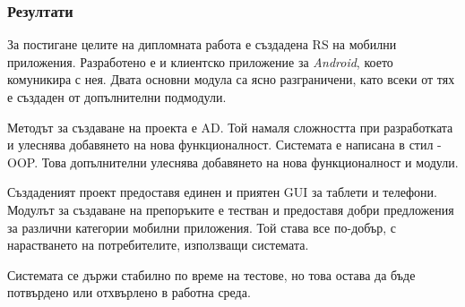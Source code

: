 \subsubsection{Резултати}

	За постигане целите на дипломната работа е създадена \ac{RS} на мобилни приложения. Разработено е и клиентско приложение за \emph{Android}, което комуникира с нея. Двата основни модула са ясно разграничени, като всеки от тях е създаден от допълнителни подмодули.
	
	Методът за създаване на проекта е \ac{AD}. Той намаля сложността при разработката и улеснява добавянето на нова функционалност. Системата е написана в стил - \ac{OOP}. Това допълнителни улеснява добавянето на нова функционалност и модули.
	
	Създаденият проект предоставя единен и приятен \ac{GUI} за таблети и телефони. Модулът за създаване на препоръките е тестван и предоставя добри предложения за различни категории мобилни приложения. Той става все по-добър, с нарастването на потребителите, използващи системата.
	
	Системата се държи стабилно по време на тестове, но това остава да бъде потвърдено или отхвърлено в работна среда.